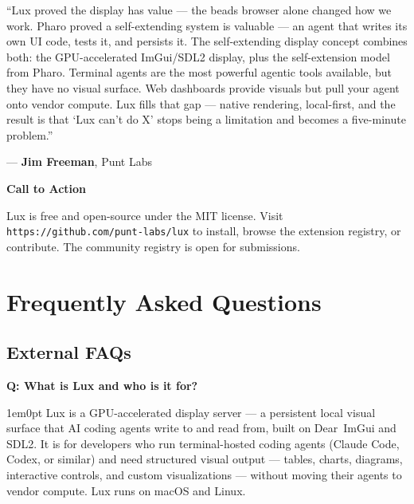 \documentclass[11pt,letterpaper]{article}
\newcommand{\prsection}[1]{%
  \vspace{1em}%
  {\large\bfseries\color{SectionBlue}#1}%
  \vspace{0.3em}\par%
}
\newcounter{faqnum}
\newenvironment{faqpair}[1]{%
  \needspace{4\baselineskip}%
  \vspace{0.5em}%
  \refstepcounter{faqnum}%
  \noindent\textbf{\color{SectionBlue}Q\thefaqnum: #1}\par\nopagebreak[4]%
  \vspace{0.2em}%
  \begin{adjustwidth}{1em}{0pt}%
  \setlength{\parindent}{0pt}%
}{%
  \end{adjustwidth}%
  \vspace{0.5em}%
}
\begin{document}
\begin{spokespersonquote}
``Lux proved the display has value --- the beads browser alone changed
how we work.  Pharo proved a self-extending system is valuable --- an agent
that writes its own UI code, tests it, and persists it.  The self-extending
display concept combines both: the GPU-accelerated ImGui/SDL2 display, plus
the self-extension model from Pharo.  Terminal agents are the most powerful
agentic tools available, but they have no visual surface.  Web dashboards
provide visuals but pull your agent onto vendor compute.  Lux fills that
gap --- native rendering, local-first, and the result is that `Lux can't
do X' stops being a limitation and becomes a five-minute problem.''

\raggedleft --- \textbf{Jim Freeman}, Punt Labs
\end{spokespersonquote}

\prsection{Call to Action}

Lux is free and open-source under the MIT license.  Visit
{\small\texttt{https://github.com/punt-labs/lux}} to install, browse the
extension registry, or contribute.  The community registry is open for
submissions.

\newpage


\section*{Frequently Asked Questions}


\subsection*{External FAQs}

\begin{faqpair}{What is Lux and who is it for?}\label{faq:what}
  Lux is a GPU-accelerated display server --- a persistent local visual
  surface that AI coding agents write to and read from, built on
  Dear~ImGui\cite{imgui2025} and SDL2.  It is for developers who run
  terminal-hosted coding agents (Claude Code, Codex, or similar) and
  need structured visual output --- tables, charts, diagrams, interactive
  controls, and custom visualizations --- without moving their agents to
  vendor compute.  Lux runs on macOS and Linux.
\end{faqpair}
\end{document}
